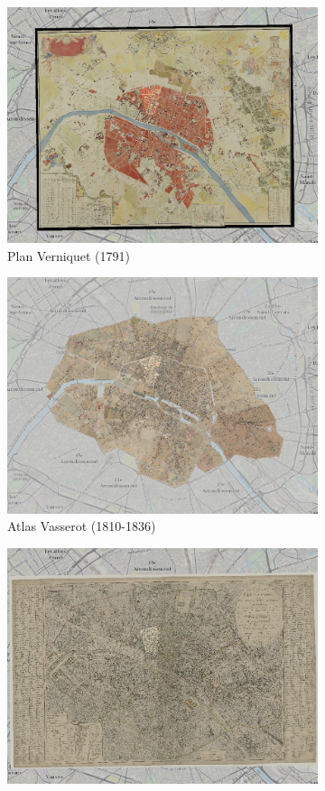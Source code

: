 
\begin{figure}
    \begin{subfigure}{.5\textwidth}
      \centering
      \includegraphics[width=0.9\linewidth]{images/plan-verniquet.png}
      \caption{Plan Verniquet (1791)}
      \label{fig:verniquet}
    \end{subfigure}
    \begin{subfigure}{.5\textwidth}
      \centering
      \includegraphics[width=0.9\linewidth]{images/plan-vasserot.png}
      \caption{Atlas Vasserot (1810-1836)}
      \label{fig:vasserot}
    \end{subfigure}
    \begin{subfigure}{.5\textwidth}
      \centering
      \includegraphics[width=0.9\linewidth]{images/plan-1812.png}

\end{subfigure}
\end{figure}
